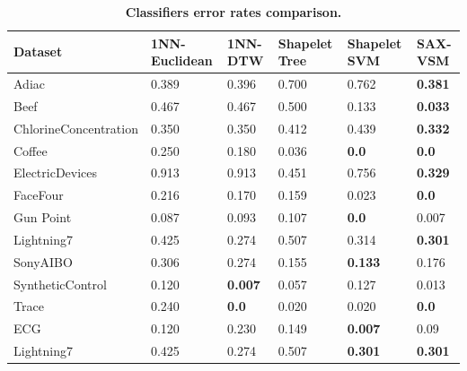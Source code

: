 \documentclass{llncs}
\begin{document}
{\scriptsize
\begin{table}%
\caption{\bf Classifiers error rates comparison.
 \label{tab:perf_table1}}
\centering
\begin{tabularx}{\linewidth}{@{} l *5X @{}}\toprule[1.5pt]
\bf Dataset &\bf 1NN-Euclidean &\bf 1NN-DTW &\bf Shapelet Tree &\bf  Shapelet SVM &\bf 
SAX-VSM\\\midrule
Adiac             & 0.389   & 0.396           & 0.700        & 0.762         & \textbf{0.381}\\
Beef              & 0.467   & 0.467           & 0.500        & 0.133         & \textbf{0.033}\\
ChlorineConcentration  & 0.350 & 0.350        & 0.412        & 0.439         & \textbf{0.332} \\
Coffee            & 0.250   & 0.180           & 0.036     & \textbf{0.0}     & \textbf{0.0} \\
ElectricDevices   & 0.913   & 0.913           & 0.451     & 0.756            & \textbf{0.329} \\
FaceFour          & 0.216   & 0.170           & 0.159     & 0.023            & \textbf{0.0} \\
Gun Point         & 0.087   & 0.093           & 0.107     & \textbf{0.0}     & 0.007 \\
Lightning7        & 0.425   & 0.274           & 0.507     & 0.314            & \textbf{0.301} \\
SonyAIBO          & 0.306   & 0.274           & 0.155     & \textbf{0.133}   & 0.176 \\
SyntheticControl  & 0.120   & \textbf{0.007}  & 0.057     & 0.127            & 0.013 \\
Trace             & 0.240   & \textbf{0.0}    & 0.020     & 0.020            & \textbf{0.0} \\
ECG               & 0.120   & 0.230           & 0.149     & \textbf{0.007}   & 0.09 \\
Lightning7        & 0.425   & 0.274           & 0.507     & \textbf{0.301}   & \textbf{0.301} \\
\bottomrule[1.25pt]
\end{tabularx}
\end{table}
}
\end{document}
